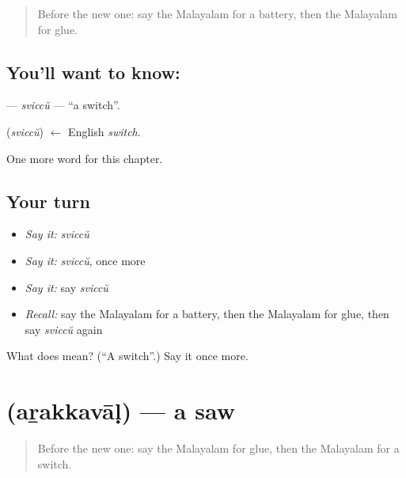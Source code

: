 \label{lesson:ML-C214-sviccu}



\begin{quote}
Before the new one: say the Malayalam for a battery, then the Malayalam for glue.
\end{quote}

\subsection*{You'll want to know: }
\textbf{} — \emph{sviccŭ} — \textquotedblleft{}a switch\textquotedblright{}.

\begin{cousinweb}
\textbf{} (\emph{sviccŭ}) $\leftarrow$ English \emph{switch}.
\end{cousinweb}

\begin{grammarlens}[title={What you've built}]
One more word for this chapter.
\end{grammarlens}

\subsection*{Your turn}
\begin{itemize}
\raggedright
  \item \emph{Say it:} \emph{sviccŭ}
  \item \emph{Say it:} \emph{sviccŭ}, once more
  \item \emph{Say it:} say \emph{sviccŭ}
  \item \emph{Recall:} say the Malayalam for a battery, then the Malayalam for glue, then say \emph{sviccŭ} again
\end{itemize}

\begin{tcolorbox}[breakable,colback=teal!4,colframe=teal!35!black,title={Before you move on}]
What does  mean? (\textquotedblleft{}A switch\textquotedblright{}.) Say it once more.
\end{tcolorbox}
\section[\texorpdfstring{\ml{അറക്കവാൾ} (aṟakkavāḷ)}{അറക്കവാൾ (aṟakkavāḷ)}]{ (aṟakkavāḷ) — a saw}

\label{lesson:ML-C214-arakkaval}



\begin{quote}
Before the new one: say the Malayalam for glue, then the Malayalam for a switch.
\end{quote}

